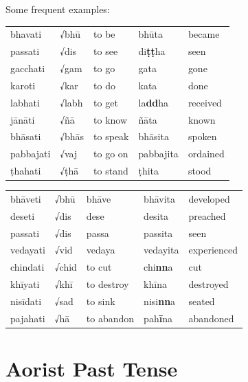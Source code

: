 \documentclass[11pt,oneside]{memoir}
\begin{document}
\normalArrayStrech

Some frequent examples:

\begin{widecols}


\begin{center}
\begin{tabular}{lllll}
bhavati & √bhū & to be & bhūta & became\\[0pt]
passati & √dis & to see & di\textbf{ṭṭ}ha & seen\\[0pt]
gacchati & √gam & to go & gata & gone\\[0pt]
karoti & √kar & to do & kata & done\\[0pt]
labhati & √labh & to get & la\textbf{dd}ha & received\\[0pt]
jānāti & √ñā & to know & ñāta & known\\[0pt]
bhāsati & √bhās & to speak & bhāsita & spoken\\[0pt]
pabbajati & √vaj & to go on & pabbajita & ordained\\[0pt]
ṭhahati & √ṭhā & to stand & ṭhita & stood\\[0pt]
\end{tabular}
\end{center}

\columnbreak

\begin{center}
\begin{tabular}{lllll}
bhāveti & √bhū & bhāve & bhāvita & developed\\[0pt]
deseti & √dis & dese & desita & preached\\[0pt]
passati & √dis & passa & passita & seen\\[0pt]
vedayati & √vid & vedaya & vedayita & experienced\\[0pt]
chindati & √chid & to cut & chi\textbf{nn}a & cut\\[0pt]
khīyati & √khī & to destroy & khīna & destroyed\\[0pt]
nisīdati & √sad & to sink & nisi\textbf{nn}a & seated\\[0pt]
pajahati & √hā & to abandon & pah\textbf{ī}na & abandoned\\[0pt]
\end{tabular}
\end{center}
\end{widecols}

\clearpage

\section{Aorist Past Tense}
\label{sec:orgd52d189}
\end{document}
